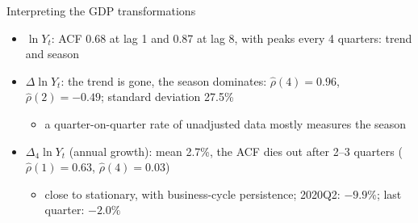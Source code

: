 \begin{frame}{Interpreting the GDP transformations}
\itemsize{\small}
\begin{itemize}
    \item $\ln Y_t$: ACF 0.68 at lag 1 and 0.87 at lag 8, with peaks every 4 quarters: trend and season
    \item $\Delta\ln Y_t$: the trend is gone, the season dominates: $\hat\rho(4) = 0.96$, $\hat\rho(2) = \ensuremath{-}0.49$; standard deviation 27.5\%
    \begin{itemize}
        \item a quarter-on-quarter rate of unadjusted data mostly measures the season
    \end{itemize}
    \item $\Delta_4\ln Y_t$ (annual growth): mean 2.7\%, the ACF dies out after 2--3 quarters ($\hat\rho(1) = 0.63$, $\hat\rho(4) = 0.03$)
    \begin{itemize}
        \item close to stationary, with business-cycle persistence; 2020Q2: $\ensuremath{-}9.9\%$; last quarter: $\ensuremath{-}2.0\%$
    \end{itemize}
\end{itemize}
\end{frame}

